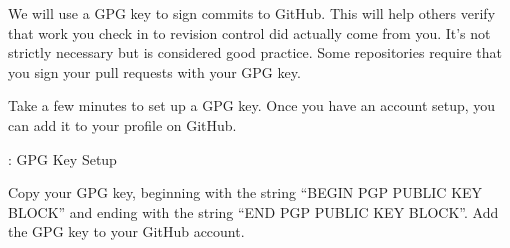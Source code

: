 \justify{}
We will use a GPG key to sign commits
to GitHub. This will help others verify that work you check in to revision control did
actually come from you. It's not strictly necessary but is considered good practice.
Some repositories require that you sign your pull requests with your GPG key.

\justify{}
Take a few minutes to set up a GPG key. Once you have an account setup, you can add
it to your profile on GitHub.

\begin{mybox}{\thetcbcounter: GPG Key Setup}

\end{mybox}

\justify{}
Copy your GPG key, beginning with the string ``BEGIN PGP PUBLIC KEY BLOCK'' and ending with the string
``END PGP PUBLIC KEY BLOCK''. Add the GPG key to your GitHub account.
